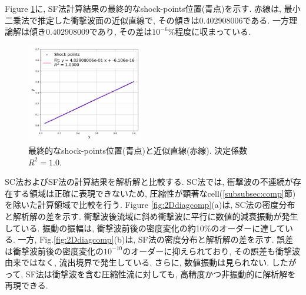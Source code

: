 \documentclass[a4j]{jarticle}
\begin{document}
Figure \ref{fig:2Ddiagapprox}に, SF法計算結果の最終的なshock-points位置(青点)を示す.
赤線は, 最小二乗法で推定した衝撃波面の近似直線で, その傾きは$0.402908006$である.
一方理論解は傾き$0.402908009$であり, その差は$10^{-6}$\%程度に収まっている.
\begin{figure}[h]
    \centering
    \includegraphics[width=0.45\textwidth]{shock_point_approx.pdf}
    \caption{最終的なshock-points位置(青点)と近似直線(赤線). 決定係数$R^2=1.0$.}
    \label{fig:2Ddiagapprox}
\end{figure}
SC法およびSF法の計算結果を解析解と比較する.
SC法では, 衝撃波の不連続が存在する領域は正確に表現できないため, 
圧縮性が顕著なcell(\ref{subsubsec:comp}節)を除いた計算領域で比較を行う.
Figure \ref{fig:2Ddiagcomp}(a)は, SC法の密度分布と解析解の差を示す.
衝撃波後流域に斜め衝撃波に平行に数値的減衰振動が発生している.
振動の振幅は, 衝撃波前後の密度変化の約10\%のオーダーに達している.
一方, Fig.\ref{fig:2Ddiagcomp}(b)は, SF法の密度分布と解析解の差を示す.
誤差は衝撃波前後の密度変化の$10^{-10}$のオーダーに抑えられており, その誤差も衝撃波由来ではなく, 流出境界で発生している.
さらに, 数値振動は見られない.
したがって, SF法は衝撃波を含む圧縮性流に対しても, 高精度かつ非振動的に解析解を再現できる.
\end{document}
